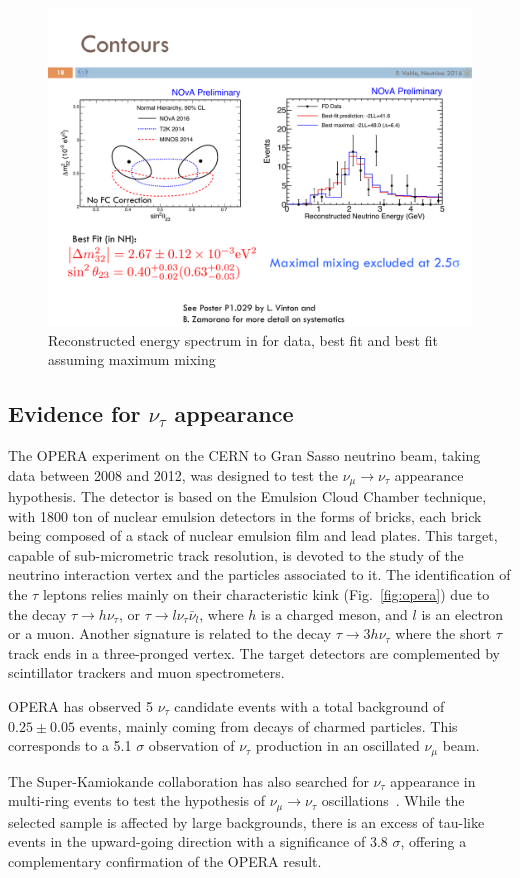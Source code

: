  \begin{figure}[htbp]
\centering
\includegraphics[width=0.6\linewidth]{figures/nova_comparison.pdf}
  \caption{Reconstructed energy spectrum in \nova for data, best fit and best fit assuming maximum mixing} \label{fig:atm-nova}
 \end{figure}
  
 
 \subsection{Evidence for $\nu_\tau$ appearance}

The OPERA experiment on the CERN to Gran Sasso neutrino beam, taking data between 2008 and 2012, was designed to test the $\nu_\mu \rightarrow \nu_\tau$ appearance hypothesis. The detector is based on the Emulsion Cloud Chamber technique, with 1800 ton of nuclear emulsion detectors in the forms of bricks, each brick being composed of a stack of nuclear emulsion film and lead plates. This target, capable of sub-micrometric track resolution, is devoted to the study of the neutrino interaction vertex and the particles associated to it. The identification of the $\tau$ leptons relies mainly on their characteristic kink (Fig.~\ref{fig:opera}) due to the decay $\tau \rightarrow h \nu_\tau$, or $\tau \rightarrow l \nu_\tau \bar \nu_l$, where $h$ is a charged meson, and $l$ is an electron or a muon. Another signature is related to the decay $\tau \rightarrow 3 h \nu_\tau$ where the short $\tau$ track ends in a three-pronged vertex. The target detectors are complemented by scintillator trackers and muon spectrometers. 

OPERA has observed 5 $\nu_\tau$ candidate events \cite{Agafonova:2015jxn} with a total background of 
$0.25 \pm 0.05$ events, mainly coming from decays of charmed particles. This corresponds to a 5.1 $\sigma$ observation of $\nu_\tau$ production in an oscillated $\nu_\mu$ beam. 

The Super-Kamiokande collaboration has also searched for $\nu_\tau$ appearance in multi-ring events to test the hypothesis of $\nu_\mu \rightarrow \nu_\tau$ oscillations~\cite{Abe:2012jj}. While the selected sample is affected by large backgrounds, there is an excess of tau-like events in the upward-going direction with a significance of 3.8 $\sigma$, offering a complementary confirmation of the OPERA result.  
 
